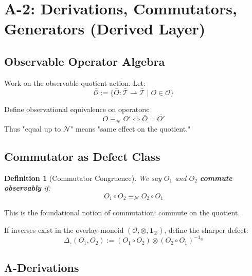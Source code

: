 \documentclass[12pt, oneside]{article}
\newtheorem{definition}[theorem]{Definition}
\newcommand{\N}{\mathcal{N}}
\newcommand{\T}{\mathcal{T}}
\newcommand{\Opr}{\mathcal{O}}
\newcommand{\Osh}{\bar{\mathcal{O}}}
\begin{document}
\newpage

\section{A-2: Derivations, Commutators, Generators (Derived Layer)}

\subsection{Observable Operator Algebra}

Work on the observable quotient-action. Let:
\begin{equation}
\Osh := \{ \bar{O}: \bar{\T} \rightharpoonup \bar{\T} \mid O \in \Opr \}
\end{equation}

Define observational equivalence on operators:
\begin{equation}
O \equiv_\N O' \Longleftrightarrow \bar{O} = \bar{O'}
\end{equation}
Thus "equal up to $\N$" means "same effect on the quotient."

\subsection{Commutator as Defect Class}

\begin{definition}[Commutator Congruence]
We say $O_1$ and $O_2$ \textbf{commute observably} if:
\begin{equation}
O_1 \circ O_2 \equiv_\N O_2 \circ O_1
\end{equation}
\end{definition}

This is the foundational notion of commutation: commute on the quotient.

If inverses exist in the overlay-monoid $(\Opr, \otimes, \mathbf{1}_\otimes)$, define the sharper defect:
\begin{equation}
\Delta_\circ(O_1, O_2) := (O_1 \circ O_2) \otimes (O_2 \circ O_1)^{-1_\otimes}
\end{equation}

\subsection{Λ-Derivations}
\end{document}
